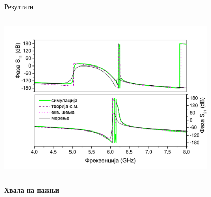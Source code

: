 \documentclass{beamer}
\begin{document}
\begin{frame}[t]{Резултати}
\begin{columns}[c]
   \includegraphics[width=0.8\textwidth]{sl_tsm/pod180/c_faza.pdf}\\
   
   \end{columns} 
\end{frame}
\begin{frame}{}
   \begin{block}{}
    \centering
    \Large\bfseries
       Хвала на пажњи
   \end{block} 
\end{frame}
\end{document}
